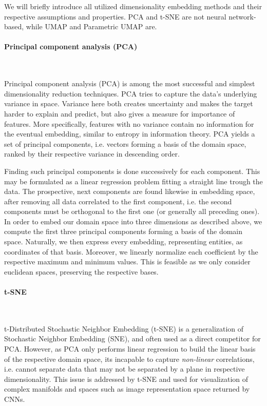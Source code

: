 \documentclass[]{article}
\renewcommand{\cite}{\citep}
\begin{document}
We will briefly introduce all utilized dimensionality embedding methods and their respective assumptions and properties. PCA and t-SNE are not neural network-based, while UMAP and Parametric UMAP are.

\paragraph{Principal component analysis (PCA)}\mbox{}\\
\label{sec:pca}


Principal component analysis (PCA) \cite{abdi2010principal, wold1987principal} is among the most successful and simplest dimensionality reduction techniques. PCA tries to capture the data's underlying variance in space. Variance here both creates uncertainty and makes the target harder to explain and predict, but also gives a measure for importance of features. More specifically, features with no variance contain no information for the eventual embedding, similar to entropy in information theory. PCA yields a set of principal components, i.e. vectors forming a basis of the domain space, ranked by their respective variance in descending order. 

Finding such principal components is done successively for each component. This may be formulated as a linear regression problem fitting a straight line trough the data. The prospective, next components are found likewise in embedding space, after removing all data correlated to the first component, i.e. the second components must be orthogonal to the first one (or generally all preceding ones). In order to embed our domain space into three dimensions as described above, we compute the first three principal components forming a basis of the domain space. Naturally, we then express every embedding, representing entities, as coordinates of that basis. Moreover, we linearly normalize each coefficient by the respective maximum and minimum values. This is feasible as we only consider euclidean spaces, preserving the respective bases.

\paragraph{t-SNE}\mbox{}\\
\label{sec:tsne}

t-Distributed Stochastic Neighbor Embedding (t-SNE) \cite{van2008visualizing} is a generalization of Stochastic Neighbor Embedding (SNE), and often used as a direct competitor for PCA. However, as PCA only performs linear regression to build the linear basis of the respective domain space, its incapable to capture \textit{non-linear} correlations, i.e. cannot separate data that may not be separated by a plane in respective dimensionality. This issue is addressed by t-SNE and used for visualization of complex manifolds and spaces such as image representation space returned by CNNs. \\
\end{document}
